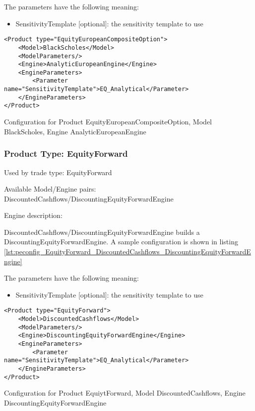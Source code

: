 The parameters have the following meaning:

\begin{itemize}
\item SensitivityTemplate [optional]: the sensitivity template to use 
\end{itemize}

\begin{longlisting}
\begin{verbatim}
<Product type="EquityEuropeanCompositeOption">
    <Model>BlackScholes</Model>
    <ModelParameters/>
    <Engine>AnalyticEuropeanEngine</Engine>
    <EngineParameters>
        <Parameter name="SensitivityTemplate">EQ_Analytical</Parameter>
    </EngineParameters>
</Product>
\end{verbatim}
\caption{Configuration for Product EquityEuropeanCompositeOption, Model BlackScholes, Engine AnalyticEuropeanEngine}
\label{lst:peconfig_EquityEuropeanCompositeOption_BlackScholes_AnalyticEuropeanEngine}
\end{longlisting}

\subsubsection{Product Type: EquityForward}

Used by trade type: EquityForward

Available Model/Engine pairs: DiscountedCashflows/DiscountingEquityForwardEngine

Engine description:

DiscountedCashflows/DiscountingEquityForwardEngine builds a DiscountingEquityForwardEngine. A sample configuration is
shown in listing \ref{lst:peconfig_EquityForward_DiscountedCashflows_DiscountingEquityForwardEngine}

The parameters have the following meaning:

\begin{itemize}
\item SensitivityTemplate [optional]: the sensitivity template to use 
\end{itemize}

\begin{longlisting}
\begin{verbatim}
<Product type="EquityForward">
    <Model>DiscountedCashflows</Model>
    <ModelParameters/>
    <Engine>DiscountingEquityForwardEngine</Engine>
    <EngineParameters>
        <Parameter name="SensitivityTemplate">EQ_Analytical</Parameter>
    </EngineParameters>
</Product>
\end{verbatim}
\caption{Configuration for Product EquiytForward, Model DiscountedCashflows, Engine DiscountingEquityForwardEngine}
\label{lst:peconfig_EquityForward_DiscountedCashflows_DiscountingEquityForwardEngine}
\end{longlisting}

